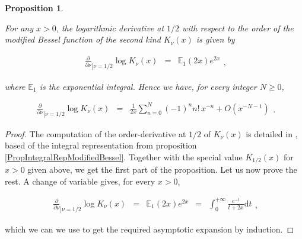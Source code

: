 \documentclass{jams-l}
\newtheorem{proposition}[theorem]{Proposition}
\theoremstyle{definition}
\theoremstyle{remark}
\numberwithin{equation}{section}
\begin{document}
        \begin{proposition}
        \label{PropDerivativeOneHalfModifiedBessel}
        
            For any $x > 0$, the logarithmic derivative at $1/2$ with respect to the order of the modified Bessel function of the second kind $K_{\nu} \left( x \right)$ is given by
            
            \[ \begin{array}{lll}
                    \frac{\partial}{\partial \nu}_{\left \vert \nu = 1/2 \right.} \log K_{\nu} \left( x \right) & = & \mathbb{E}_1 \left( 2x \right) e^{2x}
                \end{array} , \]
            
            \noindent where $\mathbb{E}_1$ is the exponential integral. Hence we have, for every integer $N \geqslant 0$,
            
            \[ \begin{array}{lll}
                    \frac{\partial}{\partial \nu}_{\left \vert \nu = 1/2 \right.} \log K_{\nu} \left( x \right) & = & \frac{1}{2x} \sum\limits_{n = 0}^{N} \left( -1 \right)^n n! \, x^{-n} + O \left( x^{-N-1} \right)
                \end{array} . \]
        
        \end{proposition}
        
        \begin{proof}
        
            The computation of the order-derivative at $1/2$ of $K_{\nu} \left( x \right)$ is detailed in \cite{MR92871}, based of the integral representation from proposition \ref{PropIntegralRepModifiedBessel}. Together with the special value $K_{1/2} \left( x \right)$ for $x > 0$ given above, we get the first part of the proposition. Let us now prove the rest. A change of variable gives, for every $x > 0$,
            
            \[ \begin{array}{lllll}
                    \frac{\partial}{\partial \nu}_{\left \vert \nu = 1/2 \right.} \log K_{\nu} \left( x \right) & = & \mathbb{E}_1 \left( 2x \right) e^{2x} & = & \int_0^{+ \infty} \frac{e^{-t}}{t + 2x} \mathrm{d}t
                \end{array} , \]
            
            \noindent which we can we use to get the required asymptotic expansion by induction.
        
        \end{proof}
        
\end{document}
